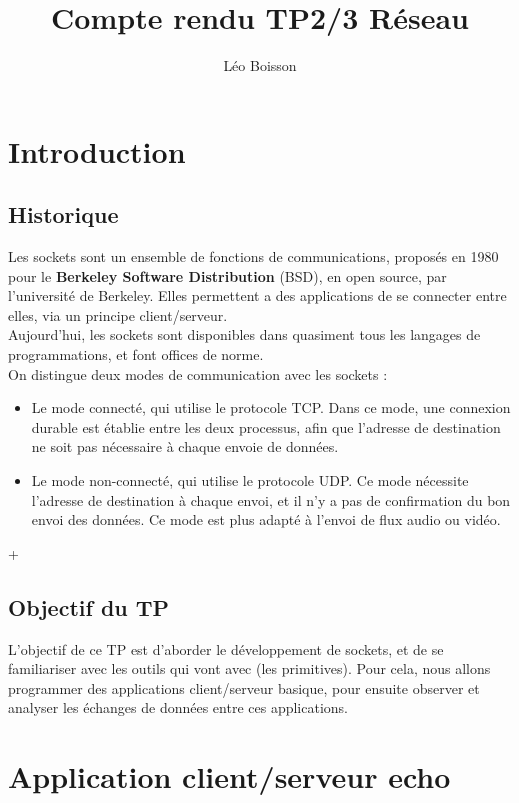 \documentclass[10pt,a4paper,final]{article}
\author{Léo Boisson}
\title{\textbf{Compte rendu TP2/3 Réseau}}
\begin{document}
\date{}
\maketitle  
\tableofcontents  
\newpage



\section{Introduction} 

	\subsection{Historique}
		Les sockets sont un ensemble de fonctions de communications, proposés en 1980 pour le \textbf{Berkeley Software Distribution} (BSD), en open source, par 								l'université de Berkeley. Elles permettent a des applications de se connecter entre elles, via un principe client/serveur.	\\
		Aujourd'hui, les sockets sont disponibles dans quasiment tous les langages de programmations, et font offices de norme.\\
		On distingue deux modes de communication avec les sockets :\\
		\begin{itemize}
			\item
				Le mode connecté, qui utilise le protocole TCP. Dans ce mode, une connexion durable est établie entre les deux processus, afin que l'adresse de destination ne 							soit pas nécessaire à chaque envoie de données.
			\item
				Le mode non-connecté, qui utilise le protocole UDP. Ce mode nécessite l'adresse de destination à chaque envoi, et il n'y a pas de confirmation du bon envoi des
				données. Ce mode est plus adapté à l'envoi de flux audio ou vidéo.
		\end{itemize}+
		
	\subsection{Objectif du TP}
		L'objectif de ce TP est d'aborder le développement de sockets, et de se familiariser avec les outils qui vont avec (les primitives). Pour cela, nous allons 
		programmer des applications client/serveur basique, pour ensuite observer et analyser les échanges de données entre ces applications.
	
	
\section{Application client/serveur echo}
\end{document}
